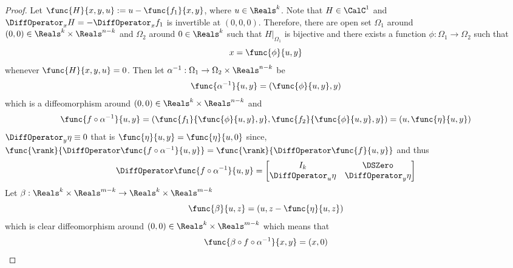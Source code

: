 \begin{proof}
    Let \(\func{H}{x,y,u} := u - \func{f_1}{x,y}\), where \(u \in \Reals^k\). Note that \(H \in \CalC^1\) and \(\DiffOperator_x H = -\DiffOperator_x f_1\) is invertible at \((0,0,0)\). Therefore, there are open set \(\Omega_1\) around \((0,0) \in \Reals^{k} \times \Reals^{n-k}\) and \(\Omega_2\) around \(0 \in \Reals^k\) such that \(H|_{\Omega_1}\) is bijective and there exists a function \(\phi: \Omega_1 \to \Omega_2\) such that
    \begin{equation*}
        x = \func{\phi}{u,y}
    \end{equation*}
    whenever \(\func{H}{x,y,u} = 0\). Then let \(\alpha^{-1} : \Omega_1 \to \Omega_2 \times \Reals^{n-k}\) be
    \begin{equation*}
        \func{\alpha^{-1}}{u,y} = (\func{\phi}{u,y},y)
    \end{equation*}
    which is a diffeomorphism around \((0,0) \in \Reals^{k} \times \Reals^{n-k}\) and
    \begin{equation*}
        \func{f \circ \alpha^{-1}}{u,y} = (\func{f_1}{\func{\phi}{u,y},y}, \func{f_2}{\func{\phi}{u,y},y}) = (u, \func{\eta}{u,y})
    \end{equation*}
    \(\DiffOperator_y \eta \equiv 0\) that is \(\func{\eta}{u,y} = \func{\eta}{u,0}\) since, \(\func{\rank}{\DiffOperator \func{f \circ \alpha^{-1}}{u,y}} = \func{\rank}{\DiffOperator \func{f}{u,y}}\) and thus
    \begin{equation*}
        \DiffOperator \func{f \circ \alpha^{-1}}{u,y} = \begin{bmatrix}
            I_k                  & \DSZero              \\
            \DiffOperator_u \eta & \DiffOperator_y \eta
        \end{bmatrix}
    \end{equation*}
    Let \(\beta : \Reals^k \times \Reals^{m-k} \to \Reals^k \times \Reals^{m-k}\)
    \begin{equation*}
        \func{\beta}{u,z} = (u,z - \func{\eta}{u,z})
    \end{equation*}
    which is clear diffeomorphism around \((0,0) \in \Reals^k \times \Reals^{m-k}\) which means that
    \begin{equation*}
        \func{ \beta \circ f \circ \alpha^{-1} }{x,y} = (x,0)
    \end{equation*}
\end{proof}

